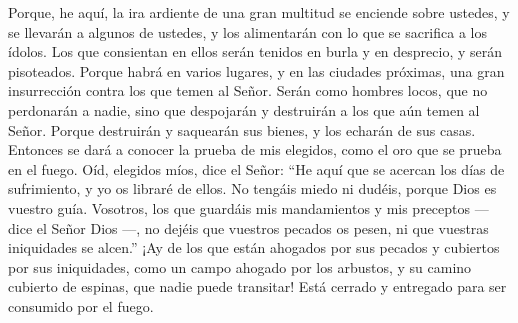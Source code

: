  Porque, he aquí, la ira ardiente de una gran multitud se
enciende sobre ustedes, y se llevarán a algunos de ustedes, y los
alimentarán con lo que se sacrifica a los ídolos.  Los
que consientan en ellos serán tenidos en burla y en desprecio, y serán
pisoteados.  Porque habrá en varios lugares, y en las
ciudades próximas, una gran insurrección contra los que temen al Señor.
 Serán como hombres locos, que no perdonarán a nadie,
sino que despojarán y destruirán a los que aún temen al Señor.
 Porque destruirán y saquearán sus bienes, y los echarán
de sus casas.  Entonces se dará a conocer la prueba de
mis elegidos, como el oro que se prueba en el fuego. 
Oíd, elegidos míos, dice el Señor: ``He aquí que se acercan los días de
sufrimiento, y yo os libraré de ellos.  No tengáis miedo
ni dudéis, porque Dios es vuestro guía.  Vosotros, los
que guardáis mis mandamientos y mis preceptos --- dice el Señor Dios
---, no dejéis que vuestros pecados os pesen, ni que vuestras
iniquidades se alcen.''  ¡Ay de los que están ahogados
por sus pecados y cubiertos por sus iniquidades, como un campo ahogado
por los arbustos, y su camino cubierto de espinas, que nadie puede
transitar!  Está cerrado y entregado para ser consumido
por el fuego.

